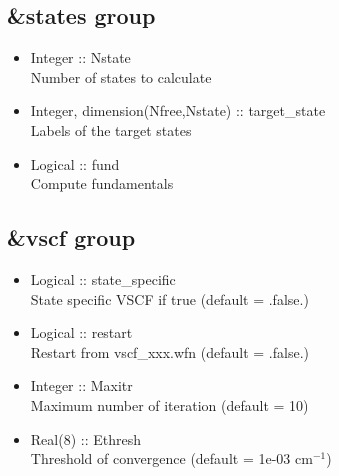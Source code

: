 \documentclass[a4paper,12pt]{article}
\begin{document}
\subsection{\&states group}
   \begin{itemize}
     \item Integer :: Nstate \\
       Number of states to calculate
     \item Integer, dimension(Nfree,Nstate) :: target\_state \\
       Labels of the target states
     \item Logical :: fund \\
       Compute fundamentals
   \end{itemize}

\subsection{\&vscf group}
   \begin{itemize}
     \item Logical :: state\_specific \\
       State specific VSCF if true (default = .false.)
     \item Logical :: restart \\
       Restart from vscf\_xxx.wfn (default = .false.)
     \item Integer :: Maxitr \\
       Maximum number of iteration (default = 10)
     \item Real(8) :: Ethresh \\
       Threshold of convergence (default = 1e-03 cm$^{-1}$)
   \end{itemize}
\end{document}
